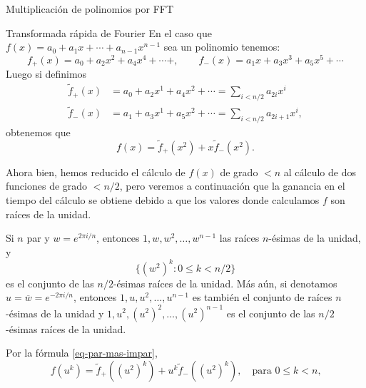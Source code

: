 \begin{chapter}{Multiplicación de polinomios por FFT}
\begin{section}{Transformada rápida de Fourier}
        En  el caso que $f(x)= a_0 + a_1x + \cdots + a_{n-1}x^{n-1}$ sea un polinomio tenemos:
        $$
        f_+(x) = a_0 + a_2 x^2 + a_4 x^4 + \cdots + , \qquad f_-(x) = a_1x + a_3 x^3 + a_5 x^5 + \cdots
        $$
        Luego  si definimos 
        \begin{align*}
            \tilde{f}_+(x) &= a_0 + a_2 x^1 + a_4 x^2 + \cdots = \sum_{i<n/2} a_{2i}x^i \\
            \tilde{f}_-(x) &= a_1 + a_3 x^1 + a_5 x^2 + \cdots= \sum_{i<n/2} a_{2i+1}x^i, 
        \end{align*}
        obtenemos que 
        \begin{equation}\label{eq-par-mas-impar}
            f(x) = \tilde{f}_+(x^2) + x \tilde{f}_-(x^2).
        \end{equation}

        Ahora bien,  hemos reducido el cálculo de $f(x)$ de grado $<n$ al cálculo de dos funciones de grado $< n/2$, pero veremos a continuación que la ganancia en el tiempo del cálculo se obtiene debido a que los valores donde calculamos $f$ son raíces de la unidad.    

        \begin{observacion}\label{obs-raices-unidad-div-2} Si $n$ par y $w = e^{2\pi i /n}$,  entonces $1, w, w^2,\ldots, w^{n-1}$ las raíces $n$-ésimas de la unidad,  y
            $$
            \{(w^2)^k: 0 \le k < {n}/{2}\}
            $$
            es el conjunto de las $n/2$-ésimas  raíces de la unidad. Más aún, si denotamos $u = \overline{w}= e^{-2\pi i /n}$, entonces  $1, u, u^2,\ldots, u^{n-1}$ es también el conjunto de raíces $n$-ésimas de la unidad y $1, {u^2}, (u^2)^2,\ldots, (u^2)^{n-1}$ es el conjunto de las $n/2$-ésimas  raíces de la unidad.
        \end{observacion}

        Por  la fórmula \eqref{eq-par-mas-impar},
        $$
        f(u^k) = \tilde{f}_+((u^2)^k) + u^k \tilde{f}_-((u^2)^k), \quad \text{para $0 \le k < n$,}
        $$
        

\end{section}
\end{chapter}
